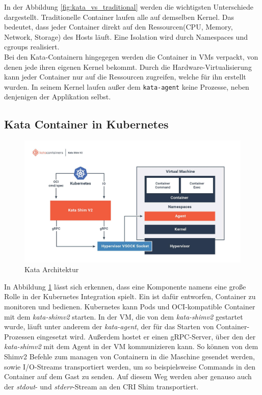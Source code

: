 In der Abbildung \ref{fig:kata_vs_traditional} werden die wichtigsten Unterschiede dargestellt.
Traditionelle Container laufen alle auf demselben Kernel. 
Das bedeutet, dass jeder Container direkt auf den Ressourcen(\ac{CPU}, Memory, Network, Storage) des Hosts läuft. 
Eine Isolation wird durch Namespaces und cgroups realisiert.
\\
Bei den Kata-Containern hingegegen werden die Container in \ac{VM}s verpackt, von denen jede ihren eigenen Kernel bekommt.
Durch die Hardware-Virtualisierung kann jeder Container nur auf die Ressourcen zugreifen, welche für ihn erstellt wurden. 
In seinem Kernel laufen außer dem \texttt{kata-agent} keine Prozesse, neben denjenigen der Applikation selbst.  

\subsection{Kata Container in Kubernetes}

\begin{figure}[ht]
        \centering
        \includegraphics[width=\textwidth]{bilder/katacontainers_architecture_diagram.jpg}
        \caption{Kata Architektur\cite{kata_learn}}
        \label{fig:kata_architecture}
\end{figure}

In Abbildung \ref{fig:kata_architecture} lässt sich erkennen, dass eine Komponente namens  eine große Rolle in der Kubernetes Integration spielt.
Ein  ist dafür entworfen, Container zu monitoren und bedienen.
Kubernetes kann Pods und \ac{OCI}-kompatible Container mit dem \textit{kata-shimv2} starten. 
In der \ac{VM}, die von dem \textit{kata-shimv2} gestartet wurde, läuft unter anderem der \textit{kata-agent}, der für das Starten von Container-Prozessen eingesetzt wird.
Außerdem hostet er einen \ac{gRPC}-Server, über den der \textit{kata-shimv2} mit dem Agent in der \ac{VM} kommunizieren kann.
So können von dem Shimv2 Befehle zum managen von Containern in die Maschine gesendet werden, sowie \ac{I/O}-Streams transportiert werden, um so beispielsweise Commands in den Container auf dem Gast zu senden.
Auf diesem Weg werden aber genauso auch der \textit{stdout}- und \textit{stderr}-Stream an den \ac{CRI} Shim transportiert.
\cite{kata_architecture}



